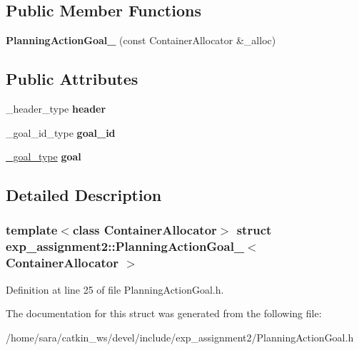 \subsection*{Public Member Functions}
\begin{DoxyCompactItemize}
\item 
\mbox{\label{structexp__assignment2_1_1PlanningActionGoal___a46dddd9b1a7998afe50ce77a4f5c6f8d}} 
{\bfseries Planning\+Action\+Goal\+\_\+} (const Container\+Allocator \&\+\_\+alloc)
\end{DoxyCompactItemize}
\subsection*{Public Attributes}
\begin{DoxyCompactItemize}
\item 
\mbox{\label{structexp__assignment2_1_1PlanningActionGoal___a418b5d548698ca48f47cb0a044d637e9}} 
\+\_\+header\+\_\+type {\bfseries header}
\item 
\mbox{\label{structexp__assignment2_1_1PlanningActionGoal___a10488aeab82b5fed4a8edda4c61cf5b1}} 
\+\_\+goal\+\_\+id\+\_\+type {\bfseries goal\+\_\+id}
\item 
\mbox{\label{structexp__assignment2_1_1PlanningActionGoal___a1eb9a233808a3fcdeffad834c6702e33}} 
\hyperlink{structexp__assignment2_1_1PlanningGoal__}{\+\_\+goal\+\_\+type} {\bfseries goal}
\end{DoxyCompactItemize}


\subsection{Detailed Description}
\subsubsection*{template$<$class Container\+Allocator$>$\newline
struct exp\+\_\+assignment2\+::\+Planning\+Action\+Goal\+\_\+$<$ Container\+Allocator $>$}



Definition at line 25 of file Planning\+Action\+Goal.\+h.



The documentation for this struct was generated from the following file\+:\begin{DoxyCompactItemize}
\item 
/home/sara/catkin\+\_\+ws/devel/include/exp\+\_\+assignment2/Planning\+Action\+Goal.\+h\end{DoxyCompactItemize}

